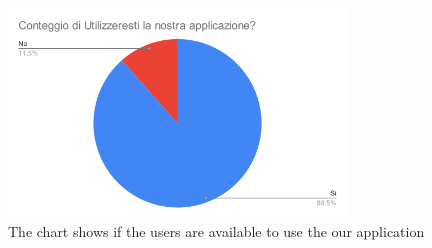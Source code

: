 \begin{figure}[htbp]
	\centering
	\includegraphics[width=0.8\textwidth]{../Draw.io diagrams/useresti_app.png}  %
	
	\caption{The chart shows if the users are available to use the our application}
\end{figure}